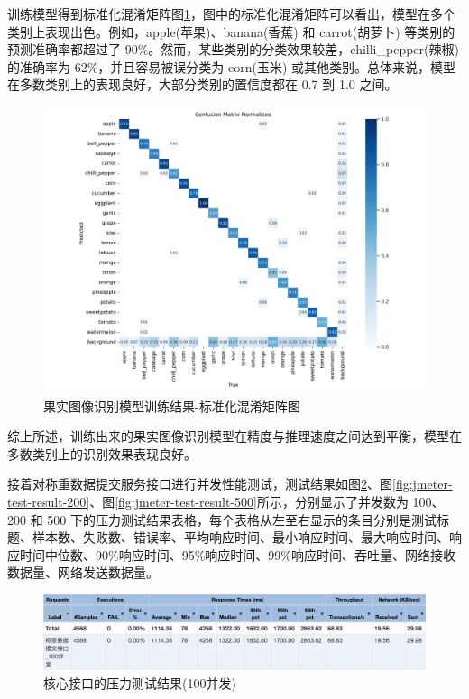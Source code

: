 训练模型得到标准化混淆矩阵图\ref{fig:confusion_matrix_normalized}，图中的标准化混淆矩阵可以看出，模型在多个类别上表现出色。例如，apple(苹果)、banana(香蕉) 和 carrot(胡萝卜) 等类别的预测准确率都超过了 90\%。然而，某些类别的分类效果较差，chilli\_pepper(辣椒)的准确率为 62\%，并且容易被误分类为 corn(玉米) 或其他类别。总体来说，模型在多数类别上的表现良好，大部分类别的置信度都在 0.7 到 1.0 之间。

\begin{figure}
    \centering
    \includegraphics[width=\linewidth]{../source/aws-img/yolov8/out/image/confusion_matrix_normalized.png}
    \caption{果实图像识别模型训练结果-标准化混淆矩阵图}
    \label{fig:confusion_matrix_normalized}
\end{figure}

综上所述，训练出来的果实图像识别模型在精度与推理速度之间达到平衡，模型在多数类别上的识别效果表现良好。

接着对称重数据提交服务接口进行并发性能测试，测试结果如图\ref{fig:jmeter-test-result-100}、图\ref{fig:jmeter-test-result-200}、图\ref{fig:jmeter-test-result-500}所示，分别显示了并发数为 100、200 和 500 下的压力测试结果表格，每个表格从左至右显示的条目分别是测试标题、样本数、失败数、错误率、平均响应时间、最小响应时间、最大响应时间、响应时间中位数、90\%响应时间、95\%响应时间、99\%响应时间、吞吐量、网络接收数据量、网络发送数据量。

\begin{figure}
    \centering
    \includegraphics[width=\linewidth]{../source/aws-test/jmeter-test-result-100.png}
    \caption{核心接口的压力测试结果(100并发)}
    \label{fig:jmeter-test-result-100}
\end{figure}

